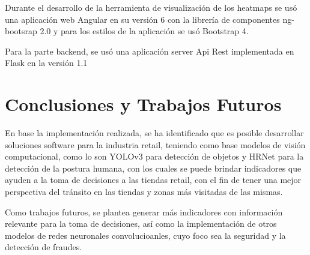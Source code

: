 \documentclass[conference]{IEEEtran}
\begin{document}
Durante el desarrollo de la herramienta de visualización de los heatmaps se usó una  aplicación web Angular en su versión 6 con la librería de componentes ng-bootsrap 2.0 y para los estilos de la aplicación se usó Bootstrap 4.

Para la parte backend, se usó una aplicación server Api Rest implementada en Flask en la versión 1.1

\section{Conclusiones y Trabajos Futuros}

En base la implementación realizada, se ha identificado que es posible desarrollar soluciones software para la industria retail, teniendo como base modelos de visión computacional, como lo son YOLOv3 para detección de objetos y HRNet para la detección de la postura humana, con los cuales se puede brindar indicadores que ayuden a la toma de decisiones a las tiendas retail, con el fin de tener una mejor perspectiva del tránsito en las tiendas y zonas más visitadas de las mismas.

Como trabajos futuros, se plantea generar más indicadores con información relevante para la toma de decisiones, así como la implementación de otros modelos de redes neuronales convolucioanles, cuyo foco sea la seguridad y la detección de fraudes.



\end{document}
